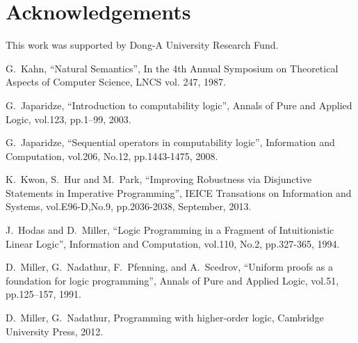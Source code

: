 \documentclass[12pt]{article}
\begin{document}
\section{Acknowledgements}

This work  was supported by Dong-A University Research Fund.


\begin{thebibliography}{1}

G.~Kahn,  ``Natural Semantics'', In the 4th Annual Symposium on Theoretical Aspects of Computer Science, 
LNCS vol. 247,  1987.



G.~Japaridze, ``Introduction to computability logic'', Annals  of Pure and
 Applied  Logic, vol.123, pp.1--99, 2003.

G.~Japaridze,   ``Sequential operators in computability logic'',
 Information and Computation, vol.206, No.12, pp.1443-1475, 2008.  

K.~Kwon, S.~Hur and M.~Park,  ``Improving Robustness via Disjunctive Statements in Imperative  Programming'', IEICE Transations on Information and Systems, vol.E96-D,No.9, pp.2036-2038, September, 2013.  

J.~Hodas and D.~Miller,   ``Logic Programming in a Fragment of Intuitionistic Linear Logic'', 
 Information and Computation, vol.110, No.2, pp.327-365, 1994. 



D.~Miller, G.~Nadathur, F.~Pfenning, and A.~Scedrov, ``Uniform proofs as a
  foundation for logic programming'', Annals of Pure and Applied Logic, vol.51,
  pp.125--157, 1991.

D.~Miller, G.~Nadathur, Programming with higher-order logic, Cambridge University Press,   2012.
\end{thebibliography}
\end{document}

